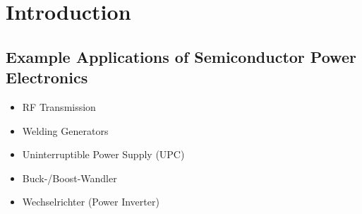 \section{Introduction}
\subsection{Example Applications of Semiconductor Power Electronics}
\begin{itemize}
        \item RF Transmission
        \item Welding Generators
        \item Uninterruptible Power Supply (UPC)
        \item Buck-/Boost-Wandler
        \item Wechselrichter (Power Inverter)
\end{itemize}
